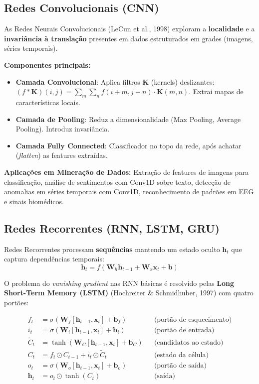 \documentclass[12pt,a4paper]{article}
\begin{document}
\subsection{Redes Convolucionais (CNN)}

As Redes Neurais Convolucionais (LeCun et al., 1998) exploram a \textbf{localidade} e a \textbf{invariância à translação} presentes em dados estruturados em grades (imagens, séries temporais).

\textbf{Componentes principais:}
\begin{itemize}
  \item \textbf{Camada Convolucional}: Aplica filtros $\mathbf{K}$ (kernels) deslizantes: $(f * \mathbf{K})(i,j) = \sum_m \sum_n f(i+m, j+n) \cdot \mathbf{K}(m,n)$. Extrai mapas de características locais.
  \item \textbf{Camada de Pooling}: Reduz a dimensionalidade (Max Pooling, Average Pooling). Introduz invariância.
  \item \textbf{Camada Fully Connected}: Classificador no topo da rede, após achatar (\textit{flatten}) as features extraídas.
\end{itemize}

\textbf{Aplicações em Mineração de Dados:} Extração de features de imagens para classificação, análise de sentimentos com Conv1D sobre texto, detecção de anomalias em séries temporais com Conv1D, reconhecimento de padrões em EEG e sinais biomédicos.

\subsection{Redes Recorrentes (RNN, LSTM, GRU)}

Redes Recorrentes processam \textbf{sequências} mantendo um estado oculto $\mathbf{h}_t$ que captura dependências temporais:
\[
  \mathbf{h}_t = f\!\left(\mathbf{W}_h \mathbf{h}_{t-1} + \mathbf{W}_x \mathbf{x}_t + \mathbf{b}\right)
\]

O problema do \textit{vanishing gradient} nas RNN básicas é resolvido pelas \textbf{Long Short-Term Memory (LSTM)} (Hochreiter \& Schmidhuber, 1997) com quatro portões:

\begin{align}
  f_t &= \sigma\!\left(\mathbf{W}_f[\mathbf{h}_{t-1}, \mathbf{x}_t] + \mathbf{b}_f\right) & &\text{(portão de esquecimento)}\\
  i_t &= \sigma\!\left(\mathbf{W}_i[\mathbf{h}_{t-1}, \mathbf{x}_t] + \mathbf{b}_i\right) & &\text{(portão de entrada)}\\
  \tilde{C}_t &= \tanh\!\left(\mathbf{W}_C[\mathbf{h}_{t-1}, \mathbf{x}_t] + \mathbf{b}_C\right) & &\text{(candidatos ao estado)}\\
  C_t &= f_t \odot C_{t-1} + i_t \odot \tilde{C}_t & &\text{(estado da célula)}\\
  o_t &= \sigma\!\left(\mathbf{W}_o[\mathbf{h}_{t-1}, \mathbf{x}_t] + \mathbf{b}_o\right) & &\text{(portão de saída)}\\
  \mathbf{h}_t &= o_t \odot \tanh(C_t) & &\text{(saída)}
\end{align}
\end{document}
